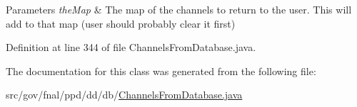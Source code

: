 \begin{DoxyParams}{Parameters}
{\em the\-Map} & The map of the channels to return to the user. This will add to that map (user should probably clear it first) \\
\hline
\end{DoxyParams}


Definition at line 344 of file Channels\-From\-Database.\-java.



The documentation for this class was generated from the following file\-:\begin{DoxyCompactItemize}
\item 
src/gov/fnal/ppd/dd/db/\hyperlink{ChannelsFromDatabase_8java}{Channels\-From\-Database.\-java}\end{DoxyCompactItemize}

